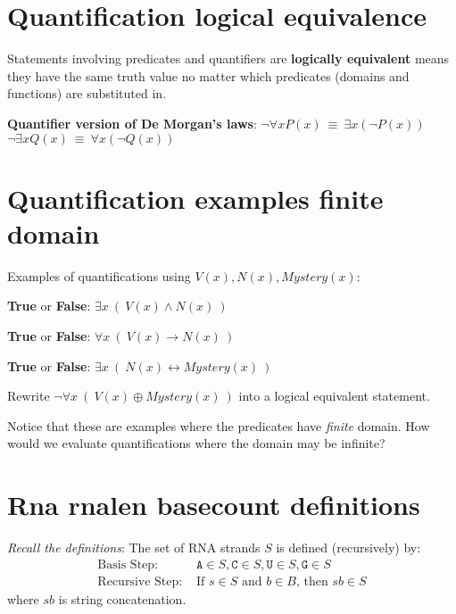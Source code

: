 \documentclass[12pt, oneside]{article}
\newcommand{\A}[0]{\texttt{A}}
\newcommand{\C}[0]{\texttt{C}}
\newcommand{\G}[0]{\texttt{G}}
\newcommand{\U}[0]{\texttt{U}}
\begin{document}
\section*{Quantification logical equivalence}


Statements involving predicates and quantifiers are {\bf logically equivalent} 
means they have the same truth value no matter which predicates (domains and functions) 
are substituted in. 

{\bf Quantifier version of De Morgan's laws}: 
$\boxed{\neg \forall x P(x) ~\equiv~ \exists x \left( \neg P(x) \right)}$
\qquad
\qquad
$\boxed{\neg \exists x Q(x) ~\equiv~ \forall x \left( \neg Q(x) \right)}$
 \vfill
\section*{Quantification examples finite domain}


Examples of quantifications using $V(x), N(x), Mystery(x)$:

{\bf True} or {\bf False}: $\exists x~ (~V(x) \land N(x)~)$

\vfill

{\bf True} or {\bf False}: $\forall x~ (~V(x) \to N(x)~)$

\vfill

{\bf True} or {\bf False}: $\exists x~ (~N(x) \leftrightarrow Mystery(x)~)$

\vfill

Rewrite $\lnot \forall x~(~V(x) \oplus Mystery(x)~)$ into a logical equivalent statement.

\vspace{50pt}


Notice that these are examples where the predicates have {\it finite} domain.
How would we evaluate quantifications where the domain may be infinite?

\vfill

 \vfill
\section*{Rna rnalen basecount definitions}


{\it Recall the definitions}: The set of RNA strands $S$ is defined (recursively) by:
\[
\begin{array}{ll}
\textrm{Basis Step: } & \A \in S, \C \in S, \U \in S, \G \in S \\
\textrm{Recursive Step: } & \textrm{If } s \in S\textrm{ and }b \in B \textrm{, then }sb \in S
\end{array}
\]
where $sb$ is string concatenation.
\end{document}
